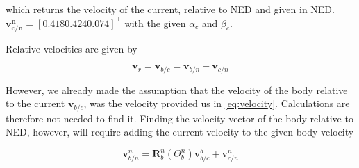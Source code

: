 which returns the velocity of the current, relative to NED and given in NED. $\mathbf{v^n_{c/n}} = [0.418 0.424 0.074]^\top$ with the given $\alpha_c$ and $\beta_c$. 

Relative velocities are given by

\begin{equation}
    \boldsymbol{v}_r = \boldsymbol{v}_{b/c} = \boldsymbol{v}_{b/n} - \boldsymbol{v}_{c/n}
    \label{eq_v_r}
\end{equation}

However, we already made the assumption that the velocity of the body relative to the current $\mathbf{v}_{b/c}$, was the velocity provided us in \eqref{eq:velocity}. Calculations are therefore not needed to find it. Finding the velocity vector of the body relative to NED, however, will require adding the current velocity to the given body velocity

\begin{equation}
    \mathbf{v}^n_{b/n} = \mathbf{R}_b^n(\Theta^n_b)\mathbf{v}_{b/c}^b + \mathbf{v}^n_{c/n}
\end{equation}

